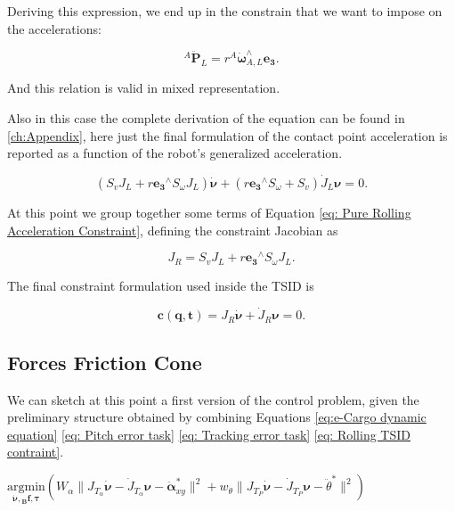 Deriving this expression, we end up in the constrain that we want to impose on the accelerations:

\begin{equation}
{}^{A} \ddot{\mathbf{P}}_{L} = r {}^{A} \dot{\bm{\omega}}^{\wedge{}}_{A,L} \mathbf{e_{3}}.
\end{equation}

And this relation is valid in mixed representation.

Also in this case the complete derivation of the equation can be found in \cref{ch:Appendix}, here just the final formulation of the contact point acceleration is reported as a function of the robot's generalized acceleration.

\begin{equation}
 (S_{v} J_{L} + r\mathbf{e_{3}}^{\wedge{}} S_{\omega} J_{L}) \dot{\bm{\nu}} + (r\mathbf{e_{3}}^{\wedge{}} S_{\omega} + S_{v}) \dot{J}_{L} \bm{\nu} = 0.
\label{eq: Pure Rolling Acceleration Constraint}
\end{equation}

At this point we group together some terms of Equation \eqref{eq: Pure Rolling Acceleration Constraint}, defining the constraint Jacobian as

\begin{equation}
    J_{R} = S_{v} J_{L} + r\mathbf{e_{3}}^{\wedge{}} S_{\omega} J_{L}.
    \label{eq: Rolling Jacobian}
\end{equation}

The final constraint formulation used inside the TSID is 

\begin{equation}
   \mathbf{c(\bm{q},t)} = J_{R}\bm{\dot{\nu}} + \dot{J}_R\bm{\nu} = 0.
    \label{eq: Rolling TSID contraint}
\end{equation}

\subsection{Forces Friction Cone}
\label{subsec:Forces Friction Cone}

We can sketch at this point a first version of the control problem, given the preliminary structure obtained by combining Equations \eqref{eq:e-Cargo dynamic equation} \eqref{eq: Pitch error task} \eqref{eq: Tracking error task} \eqref{eq: Rolling TSID contraint}.

\begin{center}
$\underset{\bm{\dot{\nu},{}_{B}\mathbf{f},\bm{\tau}}}{\text{argmin}} (W_{\alpha}\|J_{T_{\alpha}}{\dot{\bm{\nu}}} - \dot{J}_{T_{\alpha}}\bm{\nu} - \ddot{\bm{\alpha}}_{xy}^{*}\|^{2} + w_{\theta}\| J_{T_P}{\dot{\bm{\nu}}} - \dot{J}_{T_P}\bm{\nu} - \ddot{\theta}^{*} \|^{2})$


\end{center}

